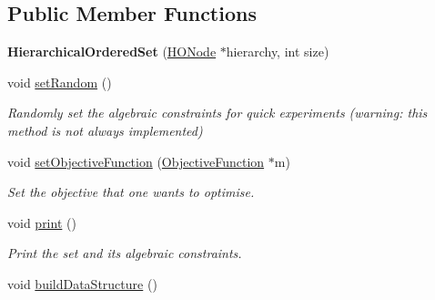 \subsection*{Public Member Functions}
\begin{DoxyCompactItemize}
\item 
\hypertarget{classHierarchicalOrderedSet_a0cba386ea748272d65cad23b0f6ed585}{{\bfseries Hierarchical\-Ordered\-Set} (\hyperlink{classHONode}{H\-O\-Node} $\ast$hierarchy, int size)}\label{classHierarchicalOrderedSet_a0cba386ea748272d65cad23b0f6ed585}

\item 
\hypertarget{classHierarchicalOrderedSet_a7e1c018e4e9608dee3519480f3929146}{void \hyperlink{classHierarchicalOrderedSet_a7e1c018e4e9608dee3519480f3929146}{set\-Random} ()}\label{classHierarchicalOrderedSet_a7e1c018e4e9608dee3519480f3929146}

\begin{DoxyCompactList}\small\item\em Randomly set the algebraic constraints for quick experiments (warning\-: this method is not always implemented) \end{DoxyCompactList}\item 
void \hyperlink{classHierarchicalOrderedSet_a813f90e2aff889461b9e089b7ff460bc}{set\-Objective\-Function} (\hyperlink{classObjectiveFunction}{Objective\-Function} $\ast$m)
\begin{DoxyCompactList}\small\item\em Set the objective that one wants to optimise. \end{DoxyCompactList}\item 
\hypertarget{classHierarchicalOrderedSet_adabb092a33f0a552d4a0e0a8cd8221bb}{void \hyperlink{classHierarchicalOrderedSet_adabb092a33f0a552d4a0e0a8cd8221bb}{print} ()}\label{classHierarchicalOrderedSet_adabb092a33f0a552d4a0e0a8cd8221bb}

\begin{DoxyCompactList}\small\item\em Print the set and its algebraic constraints. \end{DoxyCompactList}\item 
\hypertarget{classHierarchicalOrderedSet_a9672b017eee7d3b43d00e66db85f49b6}{void \hyperlink{classHierarchicalOrderedSet_a9672b017eee7d3b43d00e66db85f49b6}{build\-Data\-Structure} ()}\label{classHierarchicalOrderedSet_a9672b017eee7d3b43d00e66db85f49b6}


\end{DoxyCompactItemize}
